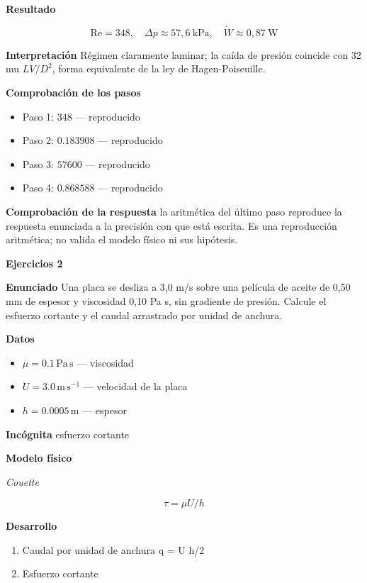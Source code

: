 \documentclass[10pt,openany]{book}
\begin{document}
\noindent\textbf{Resultado}

\[
\mathrm{Re} = 348,\quad \Delta p \approx 57{,}6\ \mathrm{kPa},\quad \dot W \approx 0{,}87\ \mathrm{W}
\]

\noindent\textbf{Interpretación}
Régimen claramente laminar; la caída de presión coincide con 32 mu \(L V/D^2\), forma equivalente de la ley de Hagen-Poiseuille.

\noindent\textbf{Comprobación de los pasos}
\begin{itemize}
\item Paso 1: $348$ — reproducido
\item Paso 2: $0.183908$ — reproducido
\item Paso 3: $57600$ — reproducido
\item Paso 4: $0.868588$ — reproducido
\end{itemize}

\noindent\textbf{Comprobación de la respuesta} la aritmética del último paso reproduce la respuesta enunciada a la precisión con que está escrita. Es una reproducción aritmética; no valida el modelo físico ni sus hipótesis.

\noindent\textbf{Ejercicios 2}

\noindent\textbf{Enunciado}
Una placa se desliza a 3,0 m/s sobre una película de aceite de 0,50 mm de espesor y viscosidad 0,10 Pa s, sin gradiente de presión. Calcule el esfuerzo cortante y el caudal arrastrado por unidad de anchura.

\noindent\textbf{Datos}
\begin{itemize}
\item $\mu = 0.1\,\mathrm{Pa}\,\mathrm{s}$ — viscosidad
\item $U = 3.0\,\mathrm{m}\,\mathrm{s}^{-1}$ — velocidad de la placa
\item $h = 0.0005\,\mathrm{m}$ — espesor
\end{itemize}

\noindent\textbf{Incógnita}
esfuerzo cortante

\noindent\textbf{Modelo físico}

\noindent\textit{Couette}

\[
\tau = \mu U/h
\]

\noindent\textbf{Desarrollo}
\begin{enumerate}
\item
Caudal por unidad de anchura q = U h/2
\item
Esfuerzo cortante
\end{enumerate}
\end{document}
